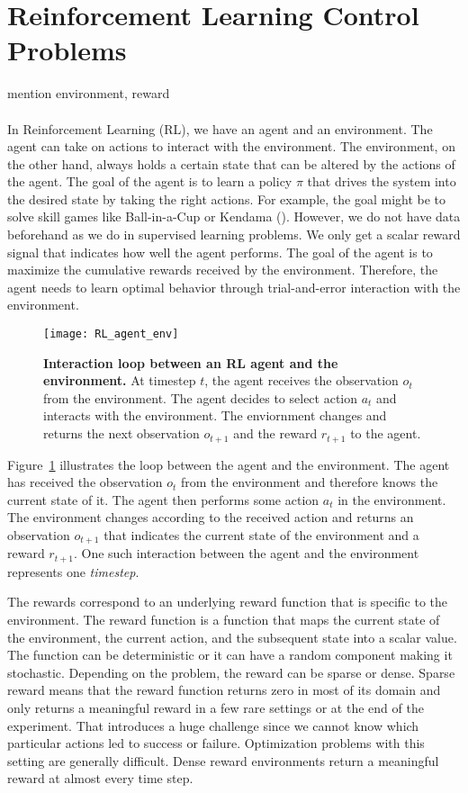 \section{Reinforcement Learning Control Problems}
mention environment, reward \\ \\
In Reinforcement Learning (RL), we have an agent and an environment. The agent can take on actions to interact with the environment. The environment, on the other hand, always holds a certain state that can be altered by the actions of the agent. The goal of the agent is to learn a policy $\pi$ that drives the system into the desired state by taking the right actions. For example, the goal might be to solve skill games like Ball-in-a-Cup or Kendama (\cite{kober2010imitation}). However, we do not have data beforehand as we do in supervised learning problems. We only get a scalar reward signal that indicates how well the agent performs. The goal of the agent is to maximize the cumulative rewards received by the environment. Therefore, the agent needs to learn optimal behavior through trial-and-error interaction with the environment.
\begin{figure}[!ht]
\centering
\texttt{[image: RL\_agent\_env]}
\caption[Interaction loop between an RL agent and the environment]{
  \textbf{Interaction loop between an RL agent and the environment.}
  At timestep $t$, the agent receives the observation $o_t$ from the environment. The agent decides to select action $a_t$ and interacts with the environment. The enviornment changes and returns the next observation $o_{t+1}$ and the reward $r_{t+1}$ to the agent.
}
\label{fig:RL_agent_env}
\end{figure}
Figure~\ref{fig:RL_agent_env} illustrates the loop between the agent and the environment. The agent has received the observation $o_t$ from the environment and therefore knows the current state of it. The agent then performs some action $a_t$ in the environment. The environment changes according to the received action and returns an observation $o_{t+1}$ that indicates the current state of the environment and a reward $r_{t+1}$. One such interaction between the agent and the environment represents one \emph{timestep}.

The rewards correspond to an underlying reward function that is specific to the environment. The reward function is a function that maps the current state of the environment, the current action, and the subsequent state into a scalar value. The function can be deterministic or it can have a random component making it stochastic. Depending on the problem, the reward can be sparse or dense. Sparse reward means that the reward function returns zero in most of its domain and only returns a meaningful reward in a few rare settings or at the end of the experiment. That introduces a huge challenge since we cannot know which particular actions led to success or failure. Optimization problems with this setting are generally difficult. Dense reward environments return a meaningful reward at almost every time step.

